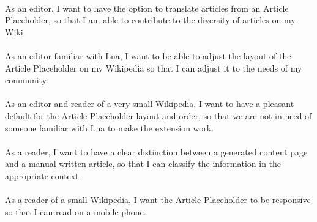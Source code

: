 \\
As an editor, I want to have the option to translate articles from an Article Placeholder, so that I am able to contribute to the diversity of articles on my Wiki. \\
\\
As an editor familiar with Lua, I want to be able to adjust the layout of the Article Placeholder on my Wikipedia so that I can adjust it to the needs of my community. \\
\\
As an editor and reader of a very small Wikipedia, I want to have a pleasant default for the Article Placeholder layout and order, so that we are not in need of someone familiar with Lua to make the extension work. \\
\\
As a reader, I want to have a clear distinction between a generated content page and a manual written article, so that I can classify the information in the appropriate context. \\
\\
As a reader of a small Wikipedia, I want the Article Placeholder to be responsive so that I can read on a mobile phone. 